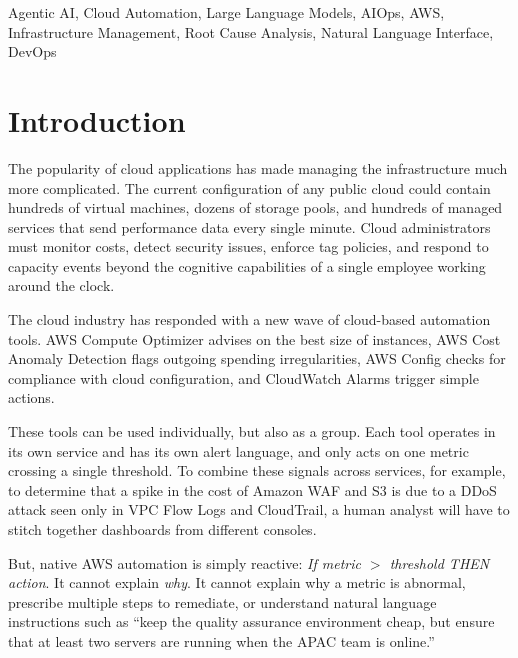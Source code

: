 \documentclass{ieeeaccess}
\begin{document}
\begin{IEEEkeywords}
Agentic AI, Cloud Automation, Large Language Models, AIOps, AWS,
Infrastructure Management, Root Cause Analysis, Natural Language Interface,
DevOps
\end{IEEEkeywords}

\titlepgskip=-15pt

\maketitle

\section{Introduction}
\label{sec:intro}

The popularity of cloud applications has made managing the infrastructure much more complicated. The current configuration of any public cloud could contain hundreds of virtual machines, dozens of storage pools, and hundreds of managed services that send performance data every single minute. Cloud administrators must monitor costs, detect security issues, enforce tag policies, and respond to capacity events beyond the cognitive capabilities of a single employee working around the clock.

The cloud industry has responded with a new wave of cloud-based automation tools. AWS Compute Optimizer advises on the best size of instances, AWS Cost Anomaly Detection flags outgoing spending irregularities, AWS Config checks for compliance with cloud configuration, and CloudWatch Alarms trigger simple actions.

These tools can be used individually, but also as a group. Each tool operates in its own service and has its own alert language, and only acts on one metric crossing a single threshold. To combine these signals across services, for example, to determine that a spike in the cost of Amazon WAF and S3 is due to a DDoS attack seen only in VPC Flow Logs and CloudTrail, a human analyst will have to stitch together dashboards from different consoles.

But, native AWS automation is simply reactive: \textit{If metric $>$ threshold THEN action}. It cannot explain \textit{why}. It cannot explain why a metric is abnormal, prescribe multiple steps to remediate, or understand natural language instructions such as “keep the quality assurance environment cheap, but ensure that at least two servers are running when the APAC team is online.”
\end{document}

